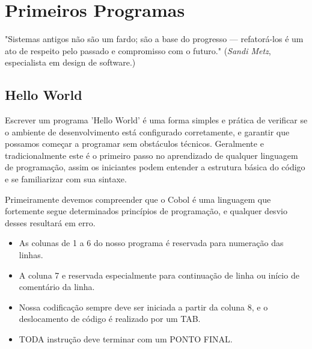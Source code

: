 \chapter{Primeiros Programas}

\begin{remark}
	"Sistemas antigos não são um fardo; são a base do progresso — refatorá-los é um ato de respeito pelo passado e compromisso com o futuro." (\textit{Sandi Metz}, especialista em design de software.) 
\end{remark}

\section{Hello World}
Escrever um programa 'Hello World' é uma forma simples e prática de verificar se o ambiente de desenvolvimento está configurado corretamente, e garantir que possamos começar a programar sem obstáculos técnicos. Geralmente e tradicionalmente este é o primeiro passo no aprendizado de qualquer linguagem de programação, assim os iniciantes podem entender a estrutura básica do código e se familiarizar com sua sintaxe.

Primeiramente devemos compreender que o Cobol é uma linguagem que fortemente segue determinados princípios de programação, e qualquer desvio desses resultará em erro.
\begin{itemize}
	\item As colunas de 1 a 6 do nosso programa é reservada para numeração das linhas.
	\item A coluna 7 e reservada especialmente para continuação de linha ou início de comentário da linha.
	\item Nossa codificação sempre deve ser iniciada a partir da coluna 8, e o deslocamento de código é realizado por um TAB.
	\item TODA instrução deve terminar com um PONTO FINAL.
\end{itemize}

